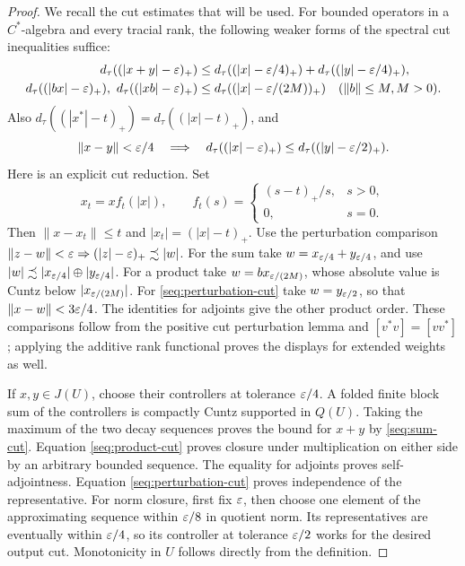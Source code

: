\begin{proof}
We recall the cut estimates that will be used. For bounded operators
in a \(C^*\)-algebra and every tracial rank, the following weaker
forms of the spectral cut inequalities suffice:
\begin{align}
 d_\tau((|x+y|-\varepsilon)_+)
 &\leq d_\tau((|x|-\varepsilon/4)_+)
       +d_\tau((|y|-\varepsilon/4)_+),
 \label{seq:sum-cut}\\
 d_\tau((|bx|-\varepsilon)_+),\ d_\tau((|xb|-\varepsilon)_+)
 &\leq d_\tau((|x|-\varepsilon/(2M))_+)
 \quad(\|b\|\leq M, M>0).
 \label{seq:product-cut}
\end{align}
Also \(d_\tau((|x^*|-t)_+)=d_\tau((|x|-t)_+)\), and
\begin{equation}\label{seq:perturbation-cut}
 \|x-y\|<\varepsilon/4
 \quad\Longrightarrow\quad
 d_\tau((|x|-\varepsilon)_+)
 \leq d_\tau((|y|-\varepsilon/2)_+).
\end{equation}
Here is an explicit cut reduction. Set
\[
 x_t=x f_t(|x|),\qquad
 f_t(s)=\begin{cases}(s-t)_+/s,&s>0,\\0,&s=0.\end{cases}
\]
Then \(\|x-x_t\|\leq t\) and
\(|x_t|=(|x|-t)_+\). Use the perturbation comparison
\(\|z-w\|<\varepsilon\Rightarrow(|z|-\varepsilon)_+\precsim|w|\).
For the sum take \(w=x_{\varepsilon/4}+y_{\varepsilon/4}\), and use
\(|w|\precsim|x_{\varepsilon/4}|\oplus|y_{\varepsilon/4}|\).
For a product take \(w=bx_{\varepsilon/(2M)}\), whose absolute value is
Cuntz below \(|x_{\varepsilon/(2M)}|\). For
\eqref{seq:perturbation-cut} take \(w=y_{\varepsilon/2}\), so that
\(\|x-w\|<3\varepsilon/4\). The identities for adjoints give the other
product order. These comparisons follow from the positive cut
perturbation lemma and \([v^*v]=[vv^*]\); applying the additive
rank functional proves the displays for extended weights as well.

If \(x,y\in J(U)\), choose their controllers at tolerance
\(\varepsilon/4\). A folded finite block sum of the controllers is
compactly Cuntz supported in \(Q(U)\). Taking the maximum of the
two decay sequences proves the bound for \(x+y\) by
\eqref{seq:sum-cut}. Equation \eqref{seq:product-cut} proves
closure under multiplication on either side by an arbitrary bounded
sequence. The equality for adjoints proves self-adjointness.
Equation \eqref{seq:perturbation-cut} proves independence of the
representative. For norm closure, first fix \(\varepsilon\), then choose
one element of the approximating sequence within \(\varepsilon/8\) in
quotient norm. Its representatives are eventually within
\(\varepsilon/4\), so its controller at tolerance \(\varepsilon/2\) works for
the desired output cut. Monotonicity in \(U\) follows directly from
the definition.


\end{proof}
